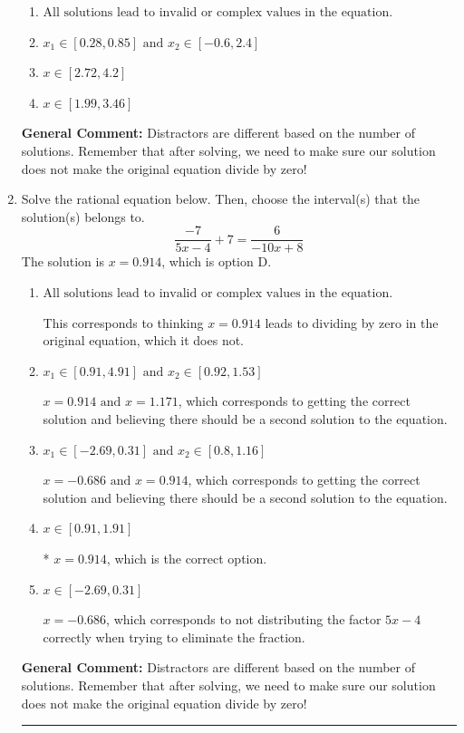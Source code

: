 \documentclass{extbook}[14pt]
\newcommand{\litem}[1]{\item #1

\rule{\textwidth}{0.4pt}}
\begin{document}
\begin{enumerate}
{\begin{enumerate}[label=\Alph*.]
* $x = 0.626 \text{ and } x = 3.532$, which is the correct option.
\item \( \text{All solutions lead to invalid or complex values in the equation.} \)


\item \( x_1 \in [0.28, 0.85] \text{ and } x_2 \in [-0.6,2.4] \)


\item \( x \in [2.72,4.2] \)


\item \( x \in [1.99,3.46] \)


\end{enumerate}

\textbf{General Comment:} Distractors are different based on the number of solutions. Remember that after solving, we need to make sure our solution does not make the original equation divide by zero!
}
\litem{
Solve the rational equation below. Then, choose the interval(s) that the solution(s) belongs to.
\[ \frac{-7}{5x -4} + 7 = \frac{6}{-10x + 8} \]The solution is \( x = 0.914 \), which is option D.\begin{enumerate}[label=\Alph*.]
\item \( \text{All solutions lead to invalid or complex values in the equation.} \)

This corresponds to thinking $x = 0.914$ leads to dividing by zero in the original equation, which it does not.
\item \( x_1 \in [0.91, 4.91] \text{ and } x_2 \in [0.92,1.53] \)

$x = 0.914 \text{ and } x = 1.171$, which corresponds to getting the correct solution and believing there should be a second solution to the equation.
\item \( x_1 \in [-2.69, 0.31] \text{ and } x_2 \in [0.8,1.16] \)

$x = -0.686 \text{ and } x = 0.914$, which corresponds to getting the correct solution and believing there should be a second solution to the equation.
\item \( x \in [0.91,1.91] \)

* $x = 0.914$, which is the correct option.
\item \( x \in [-2.69,0.31] \)

$x = -0.686$, which corresponds to not distributing the factor $5x -4$ correctly when trying to eliminate the fraction.
\end{enumerate}

\textbf{General Comment:} Distractors are different based on the number of solutions. Remember that after solving, we need to make sure our solution does not make the original equation divide by zero!
}
\end{enumerate}
\end{document}
